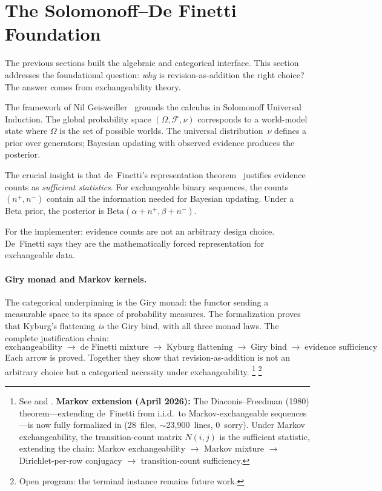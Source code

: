 \documentclass[11pt,openany]{report}
\begin{document}
\section{The Solomonoff--De Finetti Foundation}

The previous sections built the algebraic and categorical interface.
This section addresses the foundational question: \emph{why} is
revision-as-addition the right choice?  The answer comes from
exchangeability theory.

The \nuPLN{} framework of Nil Geisweiller~\cite{nuPLN2026} grounds the
calculus in Solomonoff Universal Induction.  The global probability
space $(\Omega, \mathcal{F}, \nu)$ corresponds to a world-model state
where $\Omega$ is the set of possible worlds.  The universal
distribution~$\nu$ defines a prior over generators; Bayesian updating
with observed evidence produces the posterior.

The crucial insight is that de~Finetti's representation
theorem~\cite{definetti1937} justifies evidence counts as
\emph{sufficient statistics}.  For exchangeable binary sequences, the
counts $(n^+, n^-)$ contain all the information needed for Bayesian
updating.  Under a Beta prior, the posterior is
$\text{Beta}(\alpha + n^+, \beta + n^-)$.

For the implementer: evidence counts are not an arbitrary design
choice.  De~Finetti says they are the mathematically forced
representation for exchangeable data.

\paragraph{Giry monad and Markov kernels.}
The categorical underpinning is the Giry monad: the functor sending
a measurable space to its space of probability measures.  The
formalization proves that Kyburg's flattening \emph{is} the Giry bind,
with all three monad laws.  The complete justification chain:
\[
  \text{exchangeability}
  \;\to\; \text{de Finetti mixture}
  \;\to\; \text{Kyburg flattening}
  \;\to\; \text{Giry bind}
  \;\to\; \text{evidence sufficiency}
\]
Each arrow is proved.  Together they show that revision-as-addition
is not an arbitrary choice but a categorical necessity under
exchangeability.%
\footnote{See
and
.
\textbf{Markov extension (April 2026):} The Diaconis--Freedman (1980)
theorem---extending de~Finetti from i.i.d.\ to Markov-exchangeable
sequences---is now fully formalized in
 (28~files,
${\sim}$23{,}900~lines, 0~sorry).  Under Markov exchangeability, the
transition-count matrix $N(i,j)$ is the sufficient statistic,
extending the chain: Markov exchangeability $\to$ Markov mixture
$\to$ Dirichlet-per-row conjugacy $\to$ transition-count sufficiency.
}%
\footnote{Open program: the terminal
 instance remains future
work.}
\end{document}
